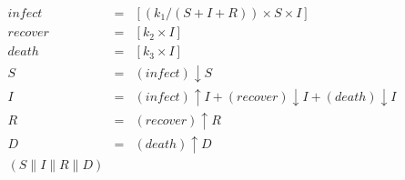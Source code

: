 \begin{eqnarray*}
\mathit{infect} & = & [(k_1/(S+I+R))\times S\times I]\\%
\mathit{recover} & = & [k_2\times I]\\%
\mathit{death} & = & [k_3\times I]\\%
%
S & = & (\mathit{infect}){\downarrow}S\\%
I & = & (\mathit{infect}){\uparrow}I + (\mathit{recover}){\downarrow}I + (\mathit{death}){\downarrow}I\\%
R & = & (\mathit{recover}){\uparrow}R\\%
D & = & (\mathit{death}){\uparrow}D\\%
%
(S {\parallel} I {\parallel} R {\parallel} D)\end{eqnarray*}
